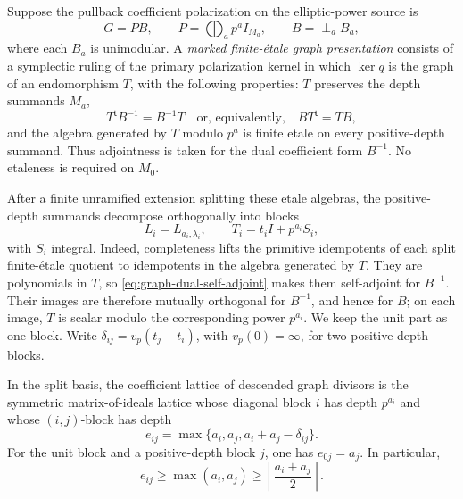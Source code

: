 Suppose the pullback coefficient polarization on the elliptic-power source is
\[
 G=PB,\qquad
 P=\bigoplus_a p^a I_{M_a},\qquad
 B=\mathop{\perp}_a B_a,
 \tag{3.2}
\]
where each \(B_a\) is unimodular.  A \emph{marked finite-\'etale graph
presentation} consists of a symplectic ruling of the primary polarization
kernel in which \(\ker q\) is the graph of an endomorphism \(T\), with the
following properties: \(T\) preserves the
depth summands \(M_a\),
\[
 T^{\mathsf t}B^{-1}=B^{-1}T
 \quad\text{or, equivalently,}\quad BT^{\mathsf t}=TB,
 \tag{3.3}
 \label{eq:graph-dual-self-adjoint}
\]
and the algebra generated by \(T\) modulo \(p^a\) is finite etale on every
positive-depth summand.  Thus adjointness is taken for the dual coefficient
form \(B^{-1}\).  No etaleness is required on \(M_0\).

After a finite unramified extension splitting these etale algebras, the
positive-depth summands decompose orthogonally into blocks
\[
 L_i=L_{a_i,\lambda_i},\qquad
 T_i=t_iI+p^{a_i}S_i,
 \tag{3.4}
 \label{eq:graph-split-block}
\]
with \(S_i\) integral.  Indeed, completeness lifts the primitive idempotents
of each split finite-\'etale quotient to idempotents in the algebra generated
by \(T\).  They are polynomials in \(T\), so
\eqref{eq:graph-dual-self-adjoint} makes them self-adjoint for
\(B^{-1}\).  Their images are therefore mutually orthogonal for \(B^{-1}\),
and hence for \(B\); on each image, \(T\) is scalar modulo the corresponding
power \(p^{a_i}\).  We keep the unit part as one block.  Write
\(\delta_{ij}=v_p(t_j-t_i)\), with \(v_p(0)=\infty\), for two
positive-depth blocks.

\begin{lemma}
\label{lem:graph-coefficient-lattice}
%
%
In the split basis, the coefficient lattice of descended graph divisors is
the symmetric matrix-of-ideals lattice whose diagonal block \(i\) has depth
\(p^{a_i}\) and whose \((i,j)\)-block has depth
\[
 e_{ij}=\max\{a_i,a_j,a_i+a_j-\delta_{ij}\}.
 \tag{3.5}
 \label{eq:graph-cross-depth}
\]
For the unit block and a positive-depth block \(j\), one has
\(e_{0j}=a_j\).
In particular,
\[
 e_{ij}\geq \max(a_i,a_j)\geq
 \left\lceil\frac{a_i+a_j}{2}\right\rceil.
 \tag{3.6}
 \label{eq:graph-midpoint-bound}
\]
\end{lemma}

